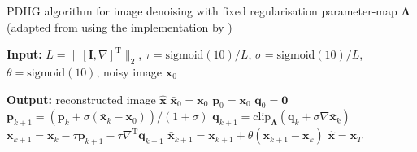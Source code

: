 \documentclass{article}
\begin{document}


\begin{algorithm}[H]
    \caption{PDHG algorithm for image denoising with fixed regularisation parameter-map $\boldsymbol{\Lambda}$ (adapted from \cite{kofler2023learning} using the implementation by \cite{dyn_img_pdhg_code})}
    \begin{algorithmic}[1]
    
    \STATE \textbf{Input:} 
    $L = \| [\mathbf{I}, \nabla]^\text{T} \|_2$, 
    $\tau = \text{sigmoid}(10) / L$, 
    $\sigma = \text{sigmoid}(10) / L$, 
    $\theta = \text{sigmoid}(10)$, 
    noisy image $\mathbf{x}_0$
    
    \STATE \textbf{Output:} reconstructed image $\hat{\mathbf{x}}$
    \STATE $\bar{\mathbf{x}}_0 = \mathbf{x}_0$
    \STATE $\mathbf{p}_0 = \mathbf{x}_0$
    \STATE $\mathbf{q}_0 = \mathbf{0}$
        \STATE $\mathbf{p}_{k+1} = \left(\mathbf{p}_k + \sigma ( \bar{\mathbf{x}}_k - \mathbf{x}_0)\right) / (1 + \sigma)$
        \STATE $\mathbf{q}_{k+1} = \text{clip}_{\boldsymbol{\Lambda}} \left(\mathbf{q}_k + \sigma \nabla \bar{\mathbf{x}}_k \right)$
        \STATE $\mathbf{x}_{k+1} = \mathbf{x}_k - \tau \mathbf{p}_{k+1} - \tau \nabla^\text{T} \mathbf{q}_{k+1}$
        \STATE $\bar{\mathbf{x}}_{k+1} = \mathbf{x}_{k+1} + \theta (\mathbf{x}_{k+1} - \mathbf{x}_k)$
    \ENDFOR
    \STATE $\hat{\mathbf{x}} = \mathbf{x}_T$
    \end{algorithmic}
    \end{algorithm}
\end{document}
